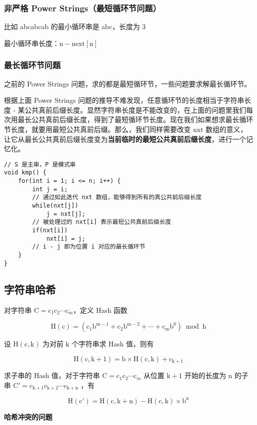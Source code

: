 \documentclass[UTF8]{article}
\begin{document}
\subsubsection{非严格 Power Strings（最短循环节问题）}
比如 abcabcab 的最小循环串是 abc，长度为 $\mathrm{3}$

最小循环串长度：$\mathrm{n-next[n]}$

\subsubsection{最长循环节问题}
之前的 Power Strings 问题，求的都是最短循环节，一些问题要求解最长循环节。

根据上面 Power Strings 问题的推导不难发现，任意循环节的长度相当于字符串长度 - 某公共真前后缀长度。显然字符串长度是不能改变的，在上面的问题里我们每次用最长公共真前后缀长度，得到了最短循环节长度。现在我们如果想求最长循环节长度，就要用最短公共真前后缀。那么，我们同样需要改变 $\mathrm{nxt}$ 数组的意义，让它从最长公共真前后缀长度变为\textbf{当前临时的最短公共真前后缀长度}，进行一个记忆化。

\begin{lstlisting}[caption=最长循环节问题]
// S 是主串，P 是模式串
void kmp() {
	for(int i = 1; i <= n; i++) {
		int j = i;
		// 通过如此迭代 nxt 数组，能够得到所有的真公共前后缀长度
		while(nxt[j])
			j = nxt[j];
		// 被处理过的 nxt[i] 表示最短公共真前后缀长度
		if(nxt[i])
			nxt[i] = j;
		// i - j 即为位置 i 对应的最长循环节
	}
}
\end{lstlisting}



\subsection{字符串哈希}
对字符串 $\text{C} = \text{c}_1\text{c} _2\cdots \text{c}_m$，定义 Hash 函数

$$
\mathrm{H(c) = (c_1b^{m-1}+c_2b^{m-2}+\cdots+c_mb^0) \bmod h} 
$$

设 $\mathrm{H(c, k)}$ 为对前 $\mathrm{k}$ 个字符串求 Hash 值，则有

$$
\mathrm{H(c, k+1) = b \times H(c, k) + c_{k + 1}}
$$

求子串的 Hash 值，对于字符串 $\text{C} = \text{c}_1\text{c} _2\cdots \text{c}_m$ 从位置 $\mathrm{k+1}$ 开始的长度为 $\mathrm{n}$ 的子串 $\mathrm{C' = c_{k+1}c_{k+2} \cdots c_{k+n} }$ ，有

$$
\mathrm{H(c') = H(c, k + n) - H(c, k) \times b^n}
$$

\noindent \textbf{哈希冲突的问题}
\end{document}
